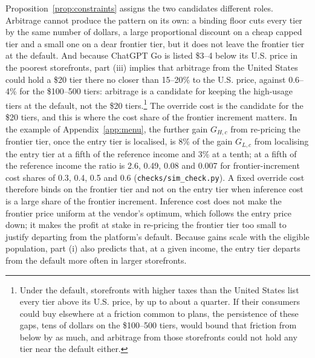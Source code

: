 \documentclass[11pt]{article}
\theoremstyle{definition}
\theoremstyle{remark}
\begin{document}
Proposition~\ref{prop:constraints} assigns the two candidates different roles. Arbitrage cannot produce the pattern on its own: a binding floor cuts every tier by the same number of dollars, a large proportional discount on a cheap capped tier and a small one on a dear frontier tier, but it does not leave the frontier tier at the default. And because ChatGPT Go is listed \$3--4 below its U.S. price in the poorest storefronts, part (iii) implies that arbitrage from the United States could hold a \$20 tier there no closer than 15--20\% to the U.S. price, against 0.6--4\% for the \$100--500 tiers: arbitrage is a candidate for keeping the high-usage tiers at the default, not the \$20 tiers.\footnote{Under the default, storefronts with higher taxes than the United States list every tier above its U.S. price, by up to about a quarter. If their consumers could buy elsewhere at a friction common to plans, the persistence of these gaps, tens of dollars on the \$100--500 tiers, would bound that friction from below by as much, and arbitrage from those storefronts could not hold any tier near the default either.} The override cost is the candidate for the \$20 tiers, and this is where the cost share of the frontier increment matters. In the example of Appendix~\ref{app:menu}, the further gain $G_{H,c}$ from re-pricing the frontier tier, once the entry tier is localised, is 8\% of the gain $G_{L,c}$ from localising the entry tier at a fifth of the reference income and 3\% at a tenth; at a fifth of the reference income the ratio is 2.6, 0.49, 0.08 and 0.007 for frontier-increment cost shares of 0.3, 0.4, 0.5 and 0.6 (\nolinkurl{checks/sim_check.py}). A fixed override cost therefore binds on the frontier tier and not on the entry tier when inference cost is a large share of the frontier increment. Inference cost does not make the frontier price uniform at the vendor's optimum, which follows the entry price down; it makes the profit at stake in re-pricing the frontier tier too small to justify departing from the platform's default. Because gains scale with the eligible population, part (i) also predicts that, at a given income, the entry tier departs from the default more often in larger storefronts.
\end{document}
